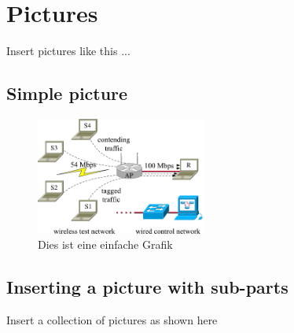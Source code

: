 %
%
\section{Pictures}
\label{sec:chapter03:Pictures}
Insert pictures like this ...

\subsection{Simple picture}
\label{sec:chapter03:grafiken:simple}


\begin{figure}[htbp]
 \centering
 \includegraphics[width=0.5\textwidth]{4.graphics/figures/setup}
 \caption{Dies ist eine einfache Grafik}
 \label{fig:chapter03:setup}
\end{figure}



\subsection{Inserting a picture with sub-parts}
\label{sec:chapter03:grafiken:subfloat}

Insert a collection of pictures as shown here

